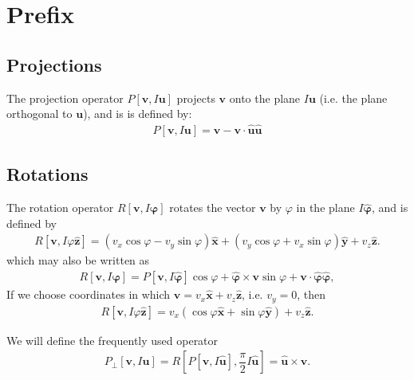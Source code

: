 \documentclass[11pt]{article}
\newcommand{\f}[2]{\dfrac{#1}{#2}} %
\newcommand{\p}[1]{\left(#1\right)} %
\renewcommand{\sp}[1]{\left[#1\right]} %
\renewcommand{\v}{\bm} %
\newcommand{\uv}[1]{\hat{\v{#1}}} %
\renewcommand{\c}{\cdot} %
\renewcommand{\phi}{\varphi} %
\begin{document}
\titlespacing{\section}{0pt}{6pt}{0pt} %
\titlespacing{\subsection}{5mm}{6pt}{0pt} %

\section*{Prefix}

\subsection*{Projections}

The projection operator $P\sp{\v v,I\v u}$ projects $\v v$ onto the
plane $I\v u$ (i.e. the plane orthogonal to $\v u$), and is is defined
by:
\begin{align}
  P\sp{\v v,I\v u}=\v v-\v v\c\uv u\uv u
\end{align}

\subsection*{Rotations}

The rotation operator $R\sp{\v v,I\v\phi}$ rotates the vector $\v v$
by $\phi$ in the plane $I\uv\phi$, and is defined by
\begin{align}
  R\sp{\v v,I\phi\uv z}=\p{v_x\cos\phi-v_y\sin\phi}\uv
  x+\p{v_y\cos\phi+v_x\sin\phi}\uv y+v_z\uv z.
\end{align}
which may also be written as
\begin{align}
  R\sp{\v v,I\v\phi}=P\sp{\v v,I\uv\phi}\cos\phi+\uv\phi\times\v
  v\sin\phi+\v v\c\uv\phi\uv\phi,
\end{align}
If we choose coordinates in which $\v v=v_x\uv x+v_z\uv z$,
i.e. $v_y=0$, then
\begin{align}
  R\sp{\v v,I\phi\uv z}=v_x\p{\cos\phi\uv x+\sin\phi\uv y}+v_z\uv z.
\end{align}

We will define the frequently used operator
\begin{align}
  P_\perp\sp{\v v,I\v u}=R\sp{P\sp{\v v,I\uv u},\f\pi2 I\uv u} =\uv
  u\times\v v.
\end{align}
\end{document}
